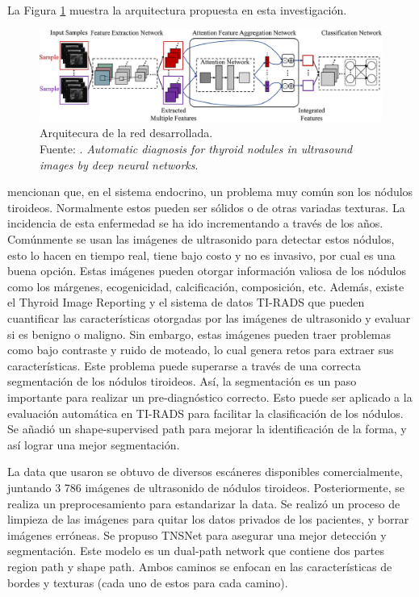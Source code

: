 La Figura \ref{2:fig103} muestra la arquitectura propuesta en esta investigación.

\begin{figure}[H]
	\begin{center}
		\includegraphics[width=1.00\textwidth]{2/figures/antecedente_8.jpg}
		\caption[Arquitecura de la red desarrollada]{Arquitecura de la red desarrollada. \\
		Fuente: \cite{pr_sun2023classthynvit}. \textit{Automatic diagnosis for thyroid nodules in ultrasound images by deep neural networks}.}
		\label{2:fig103}
	\end{center}
\end{figure}


\cite{pr_sun2022tnsnet} mencionan que, en el sistema endocrino, un problema muy común son los nódulos tiroideos. Normalmente estos pueden ser sólidos o de otras variadas texturas. La incidencia de esta enfermedad se ha ido incrementando a través de los años. Comúnmente se usan las imágenes de ultrasonido para detectar estos nódulos, esto lo hacen en tiempo real, tiene bajo costo y no es invasivo, por cual es una buena opción. Estas imágenes pueden otorgar información valiosa de los nódulos como los márgenes, ecogenicidad, calcificación, composición, etc. Además, existe el Thyroid Image Reporting y el sistema de datos TI-RADS que pueden cuantificar las características otorgadas por las imágenes de ultrasonido y evaluar si es benigno o maligno. Sin embargo, estas imágenes pueden traer problemas como bajo contraste y ruido de moteado, lo cual genera retos para extraer sus características. Este problema puede superarse a través de una correcta segmentación de los nódulos tiroideos. Así, la segmentación es un paso importante para realizar un pre-diagnóstico correcto. Esto puede ser aplicado a la evaluación automática en TI-RADS para facilitar la clasificación de los nódulos. Se añadió un shape-supervised path para mejorar la identificación de la forma, y así lograr una mejor segmentación.

La data que usaron se obtuvo de diversos escáneres disponibles comercialmente, juntando 3 786 imágenes de ultrasonido de nódulos tiroideos. Posteriormente, se realiza un preprocesamiento para estandarizar la data. Se realizó un proceso de limpieza de las imágenes para quitar los datos privados de los pacientes, y borrar imágenes erróneas. Se propuso TNSNet para asegurar una mejor detección y segmentación. Este modelo es un dual-path network que contiene dos partes region path y shape path. Ambos caminos se enfocan en las características de bordes y texturas (cada uno de estos para cada camino).

